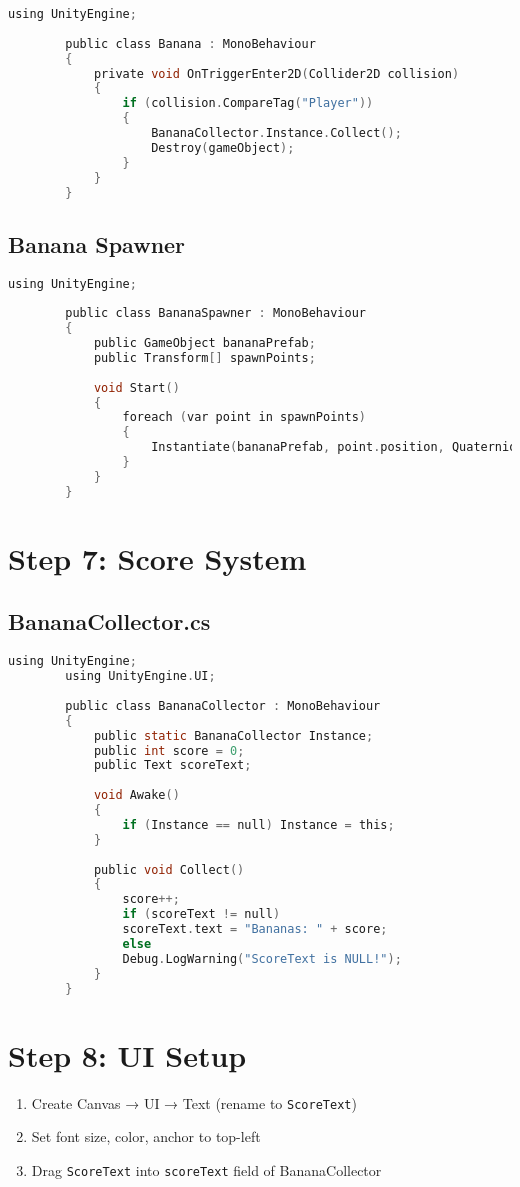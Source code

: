\documentclass[11pt]{article}
\begin{document}
	\begin{lstlisting}[language=C]
		using UnityEngine;
		
		public class Banana : MonoBehaviour
		{
			private void OnTriggerEnter2D(Collider2D collision)
			{
				if (collision.CompareTag("Player"))
				{
					BananaCollector.Instance.Collect();
					Destroy(gameObject);
				}
			}
		}
	\end{lstlisting}
	
	\subsection*{Banana Spawner}
	\begin{lstlisting}[language=C]
		using UnityEngine;
		
		public class BananaSpawner : MonoBehaviour
		{
			public GameObject bananaPrefab;
			public Transform[] spawnPoints;
			
			void Start()
			{
				foreach (var point in spawnPoints)
				{
					Instantiate(bananaPrefab, point.position, Quaternion.identity);
				}
			}
		}
	\end{lstlisting}
	
	\section*{Step 7: Score System}
	\subsection*{BananaCollector.cs}
	\begin{lstlisting}[language=C]
		using UnityEngine;
		using UnityEngine.UI;
		
		public class BananaCollector : MonoBehaviour
		{
			public static BananaCollector Instance;
			public int score = 0;
			public Text scoreText;
			
			void Awake()
			{
				if (Instance == null) Instance = this;
			}
			
			public void Collect()
			{
				score++;
				if (scoreText != null)
				scoreText.text = "Bananas: " + score;
				else
				Debug.LogWarning("ScoreText is NULL!");
			}
		}
	\end{lstlisting}
	
	\section*{Step 8: UI Setup}
	\begin{enumerate}
		\item Create Canvas → UI → Text (rename to \texttt{ScoreText})
		\item Set font size, color, anchor to top-left
		\item Drag \texttt{ScoreText} into \texttt{scoreText} field of BananaCollector
	\end{enumerate}
	
\end{document}
